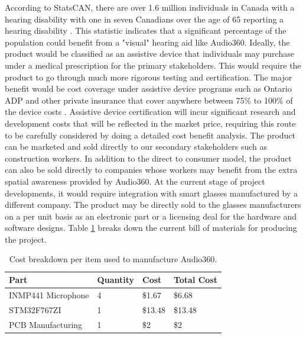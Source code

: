 \documentclass{article}
\begin{document}
According to StatsCAN, there are over 1.6 million individuals in Canada with a 
hearing disability with one in seven Canadians over the age of 65 reporting 
a hearing disability \cite{GovernmentofCanada2026}. This statistic indicates that
a significant percentage of the population could benefit from a "visual" hearing
aid like Audio360. Ideally, the product would be classified as an assistive 
device that individuals may purchase under a medical prescription for the primary
stakeholders. This would require the product to go through much more rigorous 
testing and certification. The major benefit would be cost coverage under 
assistive device programs such as Ontario ADP and other private insurance that cover 
anywhere between 75\% to 100\% of the device costs \cite{adp2016}. Assistive 
device certification will incur significant research and development costs that 
will be reflected in the market price, requiring this route to be carefully 
considered by doing a detailed cost benefit analysis. The product can be marketed
and sold directly to our secondary stakeholders such as construction workers. In 
addition to the direct to consumer model, the product can 
also be sold directly to companies whose workers may benefit from 
the extra spatial awareness provided by Audio360. At the current stage of 
project developments, it would require integration with smart glasses manufactured
by a different company. The product may be directly sold to the glasses manufacturers 
on a per unit basis as an electronic part or a licensing deal for the hardware 
and software designs. Table \ref{tab:cost_breakdown} breaks down the current
bill of materials for producing the project.

\begin{table}[H]
    \centering
    \begin{tabularx}{0.7\textwidth}{|p{3.5cm}|p{2cm}|X|X|}
        \hline
        \textbf{Part} & \textbf{Quantity} & \textbf{Cost}
        & \textbf{Total Cost} \\ \hline
        INMP441 Microphone & 4 & \$1.67 \cite{ics43434_dk} & \$6.68\\ \hline
        STM32F767ZI & 1 & \$13.48 & \$13.48 \cite{stm32f7_cost} \\ \hline
        PCB Manufacturing & 1 & \$2 & \$2 \cite{altium2020} \\ \hline
    \end{tabularx}
    \caption{Cost breakdown per item used to manufacture Audio360.}
    \label{tab:cost_breakdown}
\end{table}
\end{document}
